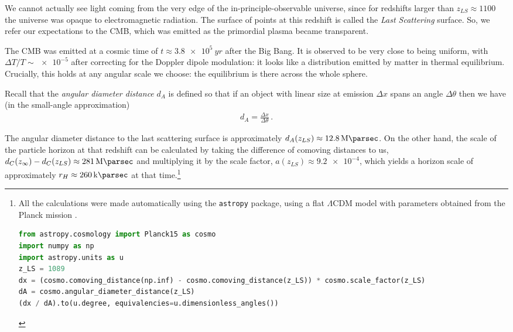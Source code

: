 \documentclass[main.tex]{subfiles}
\begin{document}
We cannot actually see light coming from the very edge of the in-principle-observable universe, since for redshifts larger than \(z _{LS} \approx 1100\) the universe was opaque to electromagnetic radiation. The surface of points at this redshift is called the \emph{Last Scattering} surface. So, we refer our expectations to the CMB, which was emitted as the primordial plasma became transparent. 






The CMB was emitted at a cosmic time of \(t \approx \SI{3.8e5}{yr}\) after the Big Bang.
It is observed to be very close to being uniform, with \(\Delta T / T \sim \num{e-5}\) after correcting for the Doppler dipole modulation: 
it looks like a distribution emitted by matter in thermal equilibrium.
Crucially, this holds at any angular scale we choose: the equilibrium is there across the whole sphere.

Recall that the \emph{angular diameter distance} \(d_A\) is defined so that if an object with linear size at emission \(\Delta x\) spans an angle \(\Delta \theta \) then we have (in the small-angle approximation) 
%
\begin{align}
d_A = \frac{\Delta x}{\Delta \theta }
\,.
\end{align}

The angular diameter distance to the last scattering surface  is approximately \(d_A (z_{LS}) \approx \SI{12.8}{\mega\parsec}\).
On the other hand, the scale of the particle horizon at that redshift can be calculated by taking the difference of comoving distances to us, \( d_C(z_\infty) - d_C(z_{LS}) \approx \SI{281}{\mega\parsec}\) and multiplying it by the scale factor, \(a(z_{LS}) \approx \num{9.2e-4}\), which yields a horizon scale of approximately \(r_H \approx \SI{260}{\kilo\parsec}\) at that time.\cprotect\footnote{All the calculations were made automatically using the \texttt{astropy} package, using a flat \(\Lambda \)CDM model with parameters obtained from the Planck mission \cite[]{adePlanck2015Results2016}.
\begin{lstlisting}[language=Python]
from astropy.cosmology import Planck15 as cosmo
import numpy as np
import astropy.units as u
z_LS = 1089
dx = (cosmo.comoving_distance(np.inf) - cosmo.comoving_distance(z_LS)) * cosmo.scale_factor(z_LS)
dA = cosmo.angular_diameter_distance(z_LS)
(dx / dA).to(u.degree, equivalencies=u.dimensionless_angles())
\end{lstlisting}}
\end{document}
